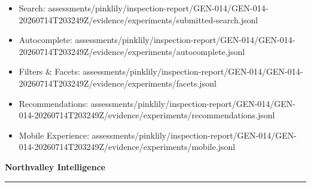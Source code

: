 \documentclass[10pt]{article}
\newcommand{\ReportFine}[1]{{\fontsize{7.6}{9.1}\selectfont\color{NVIMuted}#1}}
\begin{document}
\begin{itemize}
\item \ReportFine{Search: assessments/pinklily/inspection-report/GEN-014/GEN-014-20260714T203249Z/evidence/experiments/submitted-search.jsonl}
\item \ReportFine{Autocomplete: assessments/pinklily/inspection-report/GEN-014/GEN-014-20260714T203249Z/evidence/experiments/autocomplete.jsonl}
\item \ReportFine{Filters \& Facets: assessments/pinklily/inspection-report/GEN-014/GEN-014-20260714T203249Z/evidence/experiments/facets.jsonl}
\item \ReportFine{Recommendations: assessments/pinklily/inspection-report/GEN-014/GEN-014-20260714T203249Z/evidence/experiments/recommendations.jsonl}
\item \ReportFine{Mobile Experience: assessments/pinklily/inspection-report/GEN-014/GEN-014-20260714T203249Z/evidence/experiments/mobile.jsonl}
\end{itemize}
\vfill
\begin{center}
{\fontsize{16}{19}\selectfont\bfseries\color{NVIInk}Northvalley Intelligence}\\[0.06in]
{\color{NVIAccent}\rule{2.2in}{0.8pt}}\\[0.08in]
\ReportFine{\NorthvalleyContactLine}
\end{center}
\end{document}

